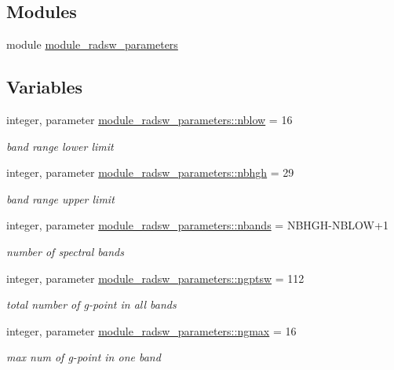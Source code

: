 \subsection*{Modules}
\begin{DoxyCompactItemize}
\item 
module \hyperlink{namespacemodule__radsw__parameters}{module\+\_\+radsw\+\_\+parameters}
\end{DoxyCompactItemize}
\subsection*{Variables}
\begin{DoxyCompactItemize}
\item 
integer, parameter \hyperlink{group__module__radsw__main_ga2c5efc91f02dc0d4bdbd5e490f44c19c}{module\+\_\+radsw\+\_\+parameters\+::nblow} = 16
\begin{DoxyCompactList}\small\item\em band range lower limit \end{DoxyCompactList}\item 
integer, parameter \hyperlink{group__module__radsw__main_ga39e5ca4fd5defbc2545ee39bbf50d61b}{module\+\_\+radsw\+\_\+parameters\+::nbhgh} = 29
\begin{DoxyCompactList}\small\item\em band range upper limit \end{DoxyCompactList}\item 
integer, parameter \hyperlink{group__module__radsw__main_ga8f97b7698e8e5e2aec6e463fd09255cc}{module\+\_\+radsw\+\_\+parameters\+::nbands} = N\+B\+H\+GH-\/N\+B\+L\+OW+1
\begin{DoxyCompactList}\small\item\em number of spectral bands \end{DoxyCompactList}\item 
integer, parameter \hyperlink{group__module__radsw__main_gadc3e4d5a848d50e2883e05c62f61bc97}{module\+\_\+radsw\+\_\+parameters\+::ngptsw} = 112
\begin{DoxyCompactList}\small\item\em total number of g-\/point in all bands \end{DoxyCompactList}\item 
integer, parameter \hyperlink{group__module__radsw__main_ga0ba0ff5c18d3303a852d88687b4b5ca9}{module\+\_\+radsw\+\_\+parameters\+::ngmax} = 16
\begin{DoxyCompactList}\small\item\em max num of g-\/point in one band \end{DoxyCompactList}\item 

\end{DoxyCompactItemize}
